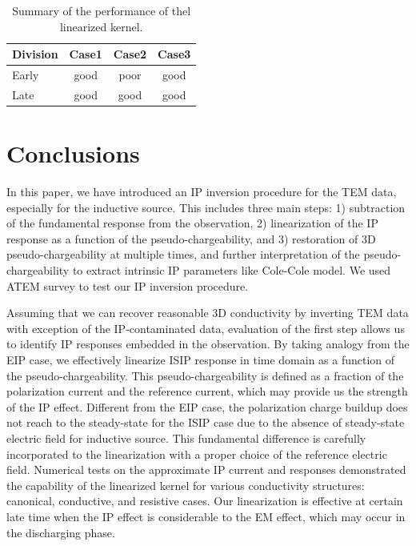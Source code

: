 \documentclass[a4paper, 11pt]{article}
\begin{document}
\begin{table}
 \caption{Summary of the performance of thel linearized kernel.}
 \label{table:summary}
 \centering
 \begin{tabular}{@{}lccc}
  Division & Case1 & Case2 & Case3  \\
  \hline
  Early & good & poor & good  \\
  Late & good & good & good \\
 \end{tabular}
\end{table}
\clearpage

\section{Conclusions}
In this paper, we have introduced an IP inversion procedure for the TEM data, especially for the inductive source. 
This includes three main steps: 1) subtraction of the fundamental response from the observation, 2) linearization of the IP response as a function of the pseudo-chargeability, and 3) restoration of 3D pseudo-chargeability at multiple times, and further interpretation of the pseudo-chargeability to extract intrinsic IP parameters like Cole-Cole model. We used ATEM survey to test our IP inversion procedure.

Assuming that we can recover reasonable 3D conductivity by inverting TEM data with exception of the IP-contaminated data, evaluation of the first step allows us to identify IP responses embedded in the observation. 
By taking analogy from the EIP case, we effectively linearize ISIP response in time domain as a function of the pseudo-chargeability. 
This pseudo-chargeability is defined as a fraction of the polarization current and the reference current, which may provide us the strength of the IP effect. 
Different from the EIP case, the polarization charge buildup does not reach to the steady-state for the ISIP case due to the absence of steady-state electric field for inductive source. 
This fundamental difference is carefully incorporated to the linearization with a proper choice of the reference electric field. 
Numerical tests on the approximate IP current and responses demonstrated the capability of the linearized kernel for various conductivity structures: canonical, conductive, and resistive cases. 
Our linearization is effective at certain late time when the IP effect is considerable to the EM effect, which may occur in the discharging phase. 
\end{document}
